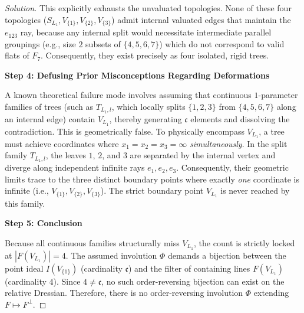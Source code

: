 \documentclass[12pt]{article}
\begin{document}
\begin{proof}[Solution]
This explicitly exhausts the unvaluated topologies. None of these four topologies ($S_{L_1}, V_{\{1\}}, V_{\{2\}}, V_{\{3\}}$) admit internal valuated edges that maintain the $e_{123}$ ray, because any internal split would necessitate intermediate parallel groupings (e.g., size $2$ subsets of $\{4,5,6,7\}$) which do not correspond to valid flats of $F_7$. Consequently, they exist precisely as four isolated, rigid trees.

\medskip
\noindent \textbf{Step 4: Defusing Prior Misconceptions Regarding Deformations}

A known theoretical failure mode involves assuming that continuous $1$-parameter families of trees (such as $T_{L_1, l}$, which locally splits $\{1,2,3\}$ from $\{4,5,6,7\}$ along an internal edge) contain $V_{L_1}$, thereby generating $\mathfrak{c}$ elements and dissolving the contradiction. This is geometrically false. To physically encompass $V_{L_1}$, a tree must achieve coordinates where $x_1=x_2=x_3=\infty$ \emph{simultaneously}. In the split family $T_{L_1, l}$, the leaves $1$, $2$, and $3$ are separated by the internal vertex and diverge along independent infinite rays $e_1, e_2, e_3$. Consequently, their geometric limits trace to the three distinct boundary points where exactly \emph{one} coordinate is infinite (i.e., $V_{\{1\}}, V_{\{2\}}, V_{\{3\}}$). The strict boundary point $V_{L_1}$ is never reached by this family.

\medskip
\noindent \textbf{Step 5: Conclusion}

Because all continuous families structurally miss $V_{L_1}$, the count is strictly locked at $|F(V_{L_1})| = 4$. The assumed involution $\Phi$ demands a bijection between the point ideal $I(V_{\{1\}})$ (cardinality $\mathfrak{c}$) and the filter of containing lines $F(V_{L_1})$ (cardinality $4$). Since $4 \neq \mathfrak{c}$, no such order-reversing bijection can exist on the relative Dressian. 
Therefore, there is no order-reversing involution $\Phi$ extending $F \mapsto F^\perp$.
\end{proof}
\end{document}
